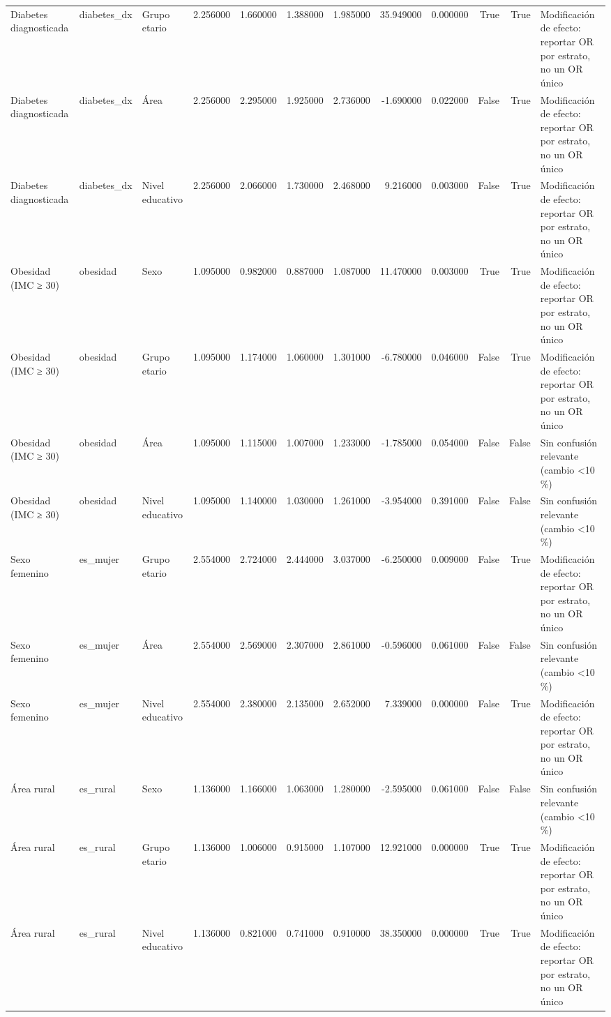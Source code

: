 \begin{table}[htbp]
\begin{tabular}{lllrrrrrrrrl}
Diabetes diagnosticada & diabetes\_dx & Grupo etario & 2.256000 & 1.660000 & 1.388000 & 1.985000 & 35.949000 & 0.000000 & True & True & Modificación de efecto: reportar OR por estrato, no un OR único \\
Diabetes diagnosticada & diabetes\_dx & Área & 2.256000 & 2.295000 & 1.925000 & 2.736000 & -1.690000 & 0.022000 & False & True & Modificación de efecto: reportar OR por estrato, no un OR único \\
Diabetes diagnosticada & diabetes\_dx & Nivel educativo & 2.256000 & 2.066000 & 1.730000 & 2.468000 & 9.216000 & 0.003000 & False & True & Modificación de efecto: reportar OR por estrato, no un OR único \\
Obesidad (IMC ≥ 30) & obesidad & Sexo & 1.095000 & 0.982000 & 0.887000 & 1.087000 & 11.470000 & 0.003000 & True & True & Modificación de efecto: reportar OR por estrato, no un OR único \\
Obesidad (IMC ≥ 30) & obesidad & Grupo etario & 1.095000 & 1.174000 & 1.060000 & 1.301000 & -6.780000 & 0.046000 & False & True & Modificación de efecto: reportar OR por estrato, no un OR único \\
Obesidad (IMC ≥ 30) & obesidad & Área & 1.095000 & 1.115000 & 1.007000 & 1.233000 & -1.785000 & 0.054000 & False & False & Sin confusión relevante (cambio <10 \%) \\
Obesidad (IMC ≥ 30) & obesidad & Nivel educativo & 1.095000 & 1.140000 & 1.030000 & 1.261000 & -3.954000 & 0.391000 & False & False & Sin confusión relevante (cambio <10 \%) \\
Sexo femenino & es\_mujer & Grupo etario & 2.554000 & 2.724000 & 2.444000 & 3.037000 & -6.250000 & 0.009000 & False & True & Modificación de efecto: reportar OR por estrato, no un OR único \\
Sexo femenino & es\_mujer & Área & 2.554000 & 2.569000 & 2.307000 & 2.861000 & -0.596000 & 0.061000 & False & False & Sin confusión relevante (cambio <10 \%) \\
Sexo femenino & es\_mujer & Nivel educativo & 2.554000 & 2.380000 & 2.135000 & 2.652000 & 7.339000 & 0.000000 & False & True & Modificación de efecto: reportar OR por estrato, no un OR único \\
Área rural & es\_rural & Sexo & 1.136000 & 1.166000 & 1.063000 & 1.280000 & -2.595000 & 0.061000 & False & False & Sin confusión relevante (cambio <10 \%) \\
Área rural & es\_rural & Grupo etario & 1.136000 & 1.006000 & 0.915000 & 1.107000 & 12.921000 & 0.000000 & True & True & Modificación de efecto: reportar OR por estrato, no un OR único \\
Área rural & es\_rural & Nivel educativo & 1.136000 & 0.821000 & 0.741000 & 0.910000 & 38.350000 & 0.000000 & True & True & Modificación de efecto: reportar OR por estrato, no un OR único \\
\bottomrule
\end{tabular}
\end{table}
